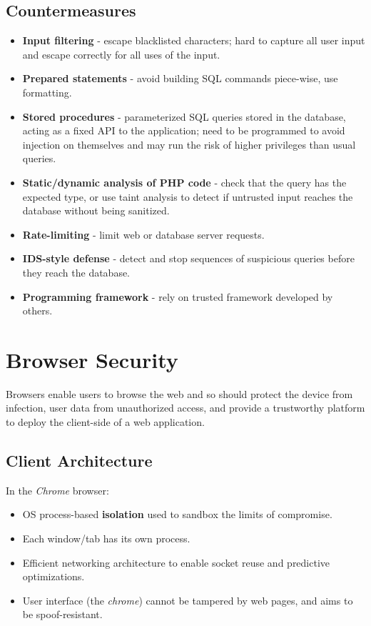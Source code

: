 \documentclass[11pt]{article}
\begin{document}
\subsection{Countermeasures}
\begin{itemize}
  \item \textbf{Input filtering} - escape blacklisted characters; hard to capture all user input and escape correctly for all uses of the input.
  \item \textbf{Prepared statements} - avoid building SQL commands piece-wise, use formatting.
  \item \textbf{Stored procedures} - parameterized SQL queries stored in the database, acting as a fixed API to the application; need to be programmed to avoid injection on themselves and may run the risk of higher privileges than usual queries.
  \item \textbf{Static/dynamic analysis of PHP code} - check that the query has the expected type, or use taint analysis to detect if untrusted input reaches the database without being sanitized.
  \item \textbf{Rate-limiting} - limit web or database server requests.
  \item \textbf{IDS-style defense} - detect and stop sequences of suspicious queries before they reach the database.
  \item \textbf{Programming framework} - rely on trusted framework developed by others.
\end{itemize}

\section{Browser Security}
Browsers enable users to browse the web and so should protect the device from infection, user data from unauthorized access, and provide a trustworthy platform to deploy the client-side of a web application.

\subsection{Client Architecture}
In the \textit{Chrome} browser:
\begin{itemize}
  \item OS process-based \textbf{isolation} used to sandbox the limits of compromise.
  \item Each window/tab has its own process.
  \item Efficient networking architecture to enable socket reuse and predictive optimizations.
  \item User interface (the \textit{chrome}) cannot be tampered by web pages, and aims to be spoof-resistant.
\end{itemize}
\end{document}
